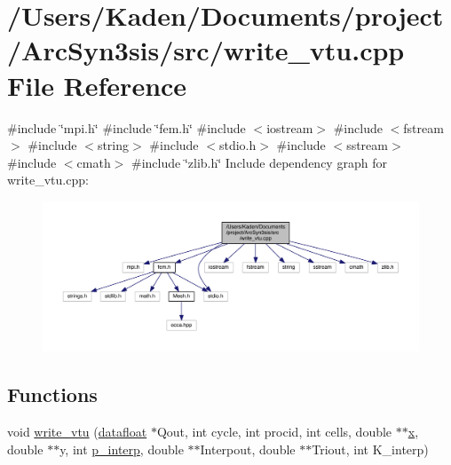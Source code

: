 \hypertarget{a00620}{}\section{/\+Users/\+Kaden/\+Documents/project/\+Arc\+Syn3sis/src/write\+\_\+vtu.cpp File Reference}
\label{a00620}
{\ttfamily \#include \char`\"{}mpi.\+h\char`\"{}}\newline
{\ttfamily \#include \char`\"{}fem.\+h\char`\"{}}\newline
{\ttfamily \#include $<$iostream$>$}\newline
{\ttfamily \#include $<$fstream$>$}\newline
{\ttfamily \#include $<$string$>$}\newline
{\ttfamily \#include $<$stdio.\+h$>$}\newline
{\ttfamily \#include $<$sstream$>$}\newline
{\ttfamily \#include $<$cmath$>$}\newline
{\ttfamily \#include \char`\"{}zlib.\+h\char`\"{}}\newline
Include dependency graph for write\+\_\+vtu.\+cpp\+:\nopagebreak
\begin{figure}[H]
\begin{center}
\leavevmode
\includegraphics[width=350pt]{a00621}
\end{center}
\end{figure}
\subsection*{Functions}
\begin{DoxyCompactItemize}
\item 
void \hyperlink{a00620_aa275e5ac3935009592aad28f023ed4a1}{write\+\_\+vtu} (\hyperlink{a00557_aa484d27c864c1a224505d8a302c0a4a4}{datafloat} $\ast$Qout, int cycle, int procid, int cells, double $\ast$$\ast$\hyperlink{a00605_ac98c3bb25378222646e977292011625f}{x}, double $\ast$$\ast$y, int \hyperlink{a00563_a08a5429e87fabfe926dd685750b12894}{p\+\_\+interp}, double $\ast$$\ast$Interpout, double $\ast$$\ast$Triout, int K\+\_\+interp)
\end{DoxyCompactItemize}



